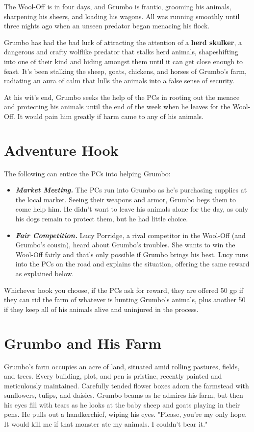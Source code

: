 \documentclass[10pt,a4paper,twoside,bg=print,twocolumn,openany,nodeprecatedcode]{dndbook}
\begin{document}
The Wool-Off is in four days, and Grumbo is frantic, grooming his animals, sharpening his sheers, and loading his wagons. All was running smoothly until three nights ago when an unseen predator began menacing his flock.

Grumbo has had the bad luck of attracting the attention of a \textbf{herd skulker}, a dangerous and crafty wolflike predator that stalks herd animals, shapeshifting into one of their kind and hiding amongst them until it can get close enough to feast. It's been stalking the sheep, goats, chickens, and horses of Grumbo's farm, radiating an aura of calm that lulls the animals into a false sense of security.

At his wit's end, Grumbo seeks the help of the PCs in rooting out the menace and protecting his animals until the end of the week when he leaves for the Wool-Off. It would pain him greatly if harm came to any of his animals.

\section{Adventure Hook}
The following can entice the PCs into helping Grumbo:


\begin{itemize}
\item \textbf{\textit{Market Meeting.}} The PCs run into Grumbo as he's purchasing supplies at the local market. Seeing their weapons and armor, Grumbo begs them to come help him. He didn't want to leave his animals alone for the day, as only his dogs remain to protect them, but he had little choice.
\item \textbf{\textit{Fair Competition.}} Lucy Porridge, a rival competitor in the Wool-Off (and Grumbo's cousin), heard about Grumbo's troubles. She wants to win the Wool-Off fairly and that's only possible if Grumbo brings his best. Lucy runs into the PCs on the road and explains the situation, offering the same reward as explained below.
\end{itemize}

Whichever hook you choose, if the PCs ask for reward, they are offered 50 gp if they can rid the farm of whatever is hunting Grumbo's animals, plus another 50 if they keep all of his animals alive and uninjured in the process.

\section{Grumbo and His Farm}
\begin{DndReadAloud}{}
Grumbo's farm occupies an acre of land, situated amid rolling pastures, fields, and trees. Every building, plot, and pen is pristine, recently painted and meticulously maintained. Carefully tended flower boxes adorn the farmstead with sunflowers, tulips, and daisies. Grumbo beams as he admires his farm, but then his eyes fill with tears as he looks at the baby sheep and goats playing in their pens. He pulls out a handkerchief, wiping his eyes. "Please, you're my only hope. It would kill me if that monster ate my animals. I couldn't bear it."

\end{DndReadAloud}
\end{document}
